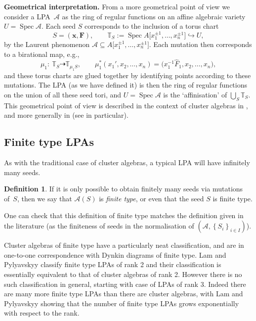 \documentclass[10pt,a4paper]{amsart}
\numberwithin{equation}{section}
\theoremstyle{definition}
\newtheorem{defn}[thm]{Definition}
\newcommand{\TT}{\mathbb{T}}
\DeclareMathOperator{\Spec}{Spec}
\begin{document}
{\bf Geometrical interpretation.}
From a more geometrical point of view we consider a LPA~$\mathcal A$ as the ring of regular functions on an affine algebraic variety $U = \Spec \mathcal A$. Each seed $S$ corresponds to the inclusion of a torus chart
\[ S= (\bm x, \bm F), \qquad \TT_S:= \Spec A\big[x_1^{\pm1},\ldots,x_n^{\pm1}\big] \hookrightarrow U, \]
by the Laurent phenomenon $\mathcal A\subseteq A\big[x_1^{\pm1},\ldots,x_n^{\pm1}\big]$. Each mutation then corresponds to a birational map, e.g.,
\[ \mu_1\colon\ \TT_S\dashrightarrow \TT_{\mu_1S}, \qquad \mu_1^*(x_1',x_2,\ldots,x_n) = \big(x_1^{-1}\hat{F}_1,x_2,\ldots,x_n\big), \]
and these torus charts are glued together by identifying points according to these mutations. The LPA (as we have defined it) is then the ring of regular functions on the union of all these seed tori, and $U=\Spec \mathcal A$ is the `affinisation' of $\bigcup_S\TT_S$. This geometrical point of view is described in the context of cluster algebras in \cite[Section~3]{ghk}, and more generally in \cite[Section~2.2]{duc} (see \cite[Remark~2.7]{duc} in particular).

\subsection{Finite type LPAs}
As with the traditional case of cluster algebras, a typical LPA will have infinitely many seeds.

\begin{defn}
If it is only possible to obtain finitely many seeds via mutations of~$S$, then we say that $\mathcal{A}(S)$ is \textit{finite type}, or even that the seed $S$ is finite type.
\end{defn}

One can check that this definition of finite type matches the definition given in the literature (as the finiteness of seeds in the normalisation of $\left(\mathcal{A}, \left\{S_i\right\}_{i\in I} \right)$).

Cluster algebras of finite type have a particularly neat classification, and are in one-to-one correspondence with Dynkin diagrams of finite type. Lam and Pylyavskyy \cite[Theorem~6.6]{lp} classify finite type LPAs of rank 2 and their classification is essentially equivalent to that of cluster algebras of rank 2. However there is no such classification in general, starting with case of LPAs of rank 3. Indeed there are many more finite type LPAs than there are cluster algebras, with Lam and Pylyavskyy showing that the number of finite type LPAs grows exponentially with respect to the rank.
\end{document}
